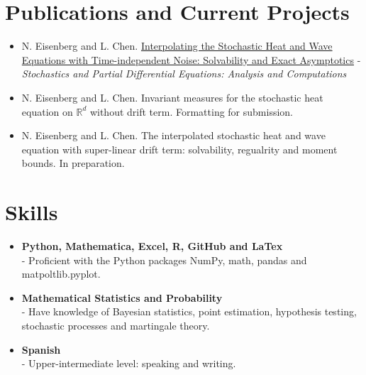 \documentclass[letterpaper,12pt]{article}
\begin{document}
 \section{Publications and Current Projects}

\begin{itemize}[]
	\item \noindent N. Eisenberg and L. Chen. \href{https://link.springer.com/epdf/10.1007/s40072-022-00258-6?sharing_token=615BToOAX2__hha95bBy5Pe4RwlQNchNByi7wbcMAY7h99-9CUgKCJ_P7MgI29SutxQPHeHVRWjEYXbYxT-ZuTjdZ_sthIDAaYOeQZxG9dXLFbji62022XQenyFaNn3mbf7oxkSN8vMrt7ARNnKURUK0-EU0s4A4ilj_xTf2X_8\%3D}{Interpolating the Stochastic Heat and Wave Equations with Time-independent Noise:
		Solvability and Exact Asymptotics} - {\em Stochastics and Partial Differential Equations: Analysis and Computations}
	
	\item \noindent N. Eisenberg and L. Chen. Invariant measures for the stochastic heat equation on $\mathbb{R}^d$ without drift term. Formatting for submission.
	
	\item \noindent N. Eisenberg and L. Chen. The interpolated stochastic heat and wave equation with super-linear drift term: solvability, regualrity and moment bounds. In preparation.
	
\end{itemize}

\section{Skills}
\begin{itemize}[]
	\item \textbf{Python, Mathematica, Excel, R, GitHub and LaTex} \\
	\vspace{.05in} 
	- Proficient with the Python packages NumPy, math, pandas and matpoltlib.pyplot. 
	
	\item \textbf{Mathematical Statistics and Probability} \\
	\vspace{.05in} 
	- Have knowledge of Bayesian statistics, point estimation, hypothesis testing, stochastic processes and martingale theory. 
	
	
	\item \textbf{Spanish} \\
	\vspace{.05in} 
	- Upper-intermediate level: speaking and writing.
	
\end{itemize}
\end{document}
